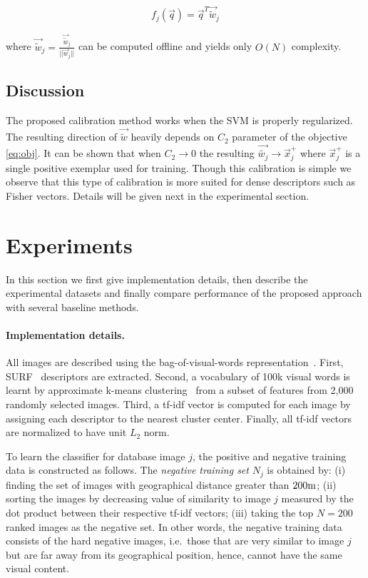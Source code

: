       \begin{equation}
         f_j(\vec{q}) = \vec{q}^T\vec{\tilde{w}}_j
         \label{eq:rescale}
      \end{equation}

      \noindent
      where $\vec{\tilde{w}}_j=\frac{\vec{\tilde{w}}_j}{||\vec{w}_j||}$ can be computed offline and yields only $O(N)$ complexity.
   \subsection{Discussion}
      The proposed calibration method works when the SVM is properly regularized. The resulting direction of $\vec{\tilde{w}}$ heavily depends on $C_2$ parameter of the objective \eqref{eq:obj}. It can be shown that when $C_2 \rightarrow 0$ the resulting $\vec{\tilde{w_j}} \rightarrow \vec{x}_j^+$ where $\vec{x}_j^+$ is a single positive exemplar used for training. Though this calibration is simple we observe that this type of calibration is more suited for dense descriptors such as Fisher vectors. Details will be given next in the experimental section. 

\section{Experiments}
\label{sec:experiments}
   In this section we first give implementation details, then describe the experimental datasets and finally compare performance of the proposed approach with several baseline methods.
   \paragraph{Implementation details.}
      All images are described using the bag-of-visual-words representation~\cite{Sivic2003}. First, SURF~\cite{Bay06} 
      descriptors are extracted. Second, a vocabulary of 100k visual words is learnt by approximate k-means clustering~\cite{Philbin07} from a subset of features from 2,000 randomly selected images. Third, a tf-idf vector is computed for each image by assigning each descriptor to the nearest cluster center.  Finally, all tf-idf vectors are normalized to have unit $L_2$ norm.

      To learn the classifier for database image $j$, the positive and negative training data
      is constructed as follows. 
      The \emph{negative training set} $N_j$ is obtained by: (i) finding the set of images with geographical distance greater than $200{\rm m}$; (ii)  sorting the images by decreasing value of similarity to image $j$ measured by the dot product between their respective tf-idf vectors; (iii) taking the top $N=200$ ranked images as the negative set. 
      In other words, the negative training data consists of the hard negative images, i.e.\ those that are very similar to image $j$ but are far away from its geographical position, hence, cannot have the same visual content.

